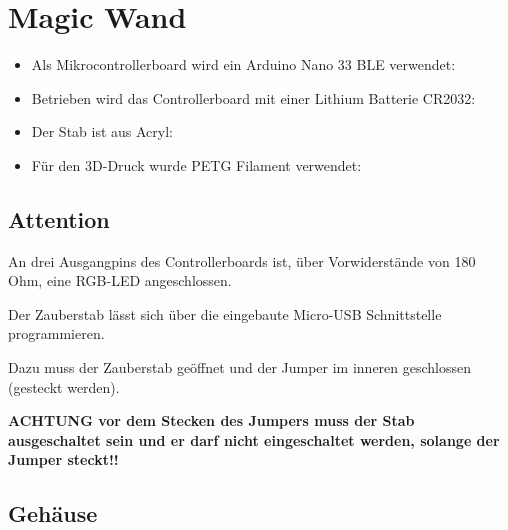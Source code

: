 %
%


\chapter{Magic Wand}



\begin{itemize}
  \item Als Mikrocontrollerboard wird ein Arduino Nano 33 BLE verwendet:
    
  \item Betrieben wird das Controllerboard mit einer Lithium Batterie CR2032: \cite{Energizer:2018}
  
        
  \item Der Stab ist aus Acryl: 
  
  \item Für den 3D-Druck wurde PETG Filament verwendet:
  
            
\end{itemize}


\section{Attention}

An drei Ausgangpins des Controllerboards ist, über Vorwiderstände von 180 Ohm, eine RGB-LED
angeschlossen.

Der Zauberstab lässt sich über die eingebaute Micro-USB Schnittstelle programmieren.

Dazu muss der Zauberstab geöffnet und der Jumper im inneren geschlossen (gesteckt werden).


\textbf{ACHTUNG vor dem Stecken des Jumpers muss der Stab ausgeschaltet sein und er darf
nicht eingeschaltet werden, solange der Jumper steckt!!}


\section{Gehäuse}


